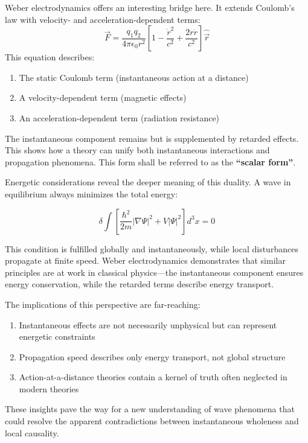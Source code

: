 Weber electrodynamics offers an interesting bridge here. It extends Coulomb's law with velocity- and acceleration-dependent terms:
\begin{equation}
    \label{eq:weber_em_skalar}
    \vec{F} = \frac{q_1q_2}{4\pi\epsilon_0r^2}\left[1 - \frac{\dot{r}^2}{c^2} + \frac{2r\ddot{r}}{c^2}\right]\hat{\vec{r}}
\end{equation}
This equation describes:
\begin{enumerate}
    \item The static Coulomb term (instantaneous action at a distance)
    \item A velocity-dependent term (magnetic effects)
    \item An acceleration-dependent term (radiation resistance)
\end{enumerate}
The instantaneous component remains but is supplemented by retarded effects. This shows how a theory can unify both instantaneous interactions and propagation phenomena.
This form shall be referred to as the \textbf{\enquote{scalar form}}.

Energetic considerations reveal the deeper meaning of this duality. A wave in equilibrium always minimizes the total energy:

\begin{equation}
    \delta \int \left[\frac{\hbar^2}{2m}|\nabla\Psi|^2 + V|\Psi|^2\right] d^3x = 0    
\end{equation}

This condition is fulfilled globally and instantaneously, while local disturbances propagate at finite speed. Weber electrodynamics demonstrates that similar principles are at work in
classical physics—the instantaneous component ensures energy conservation, while the retarded terms describe energy transport.

The implications of this perspective are far-reaching:
\begin{enumerate}
    \item Instantaneous effects are not necessarily unphysical but can represent energetic constraints
    \item Propagation speed describes only energy transport, not global structure
    \item Action-at-a-distance theories contain a kernel of truth often neglected in modern theories
\end{enumerate}
These insights pave the way for a new understanding of wave phenomena that could resolve the apparent contradictions between instantaneous wholeness and local causality.

